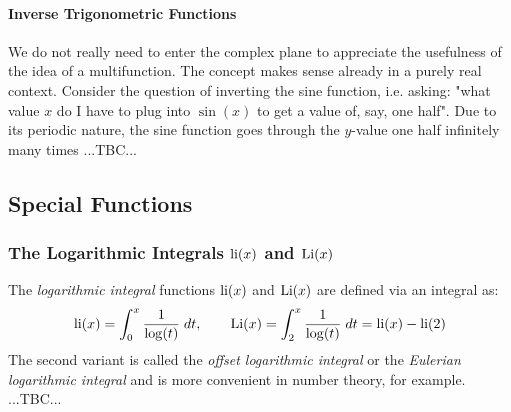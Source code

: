 \paragraph{Inverse Trigonometric Functions} 
We do not really need to enter the complex plane to appreciate the usefulness of the idea of a multifunction. The concept makes sense already in a purely real context. Consider the question of inverting the sine function, i.e. asking: "what value $x$ do I have to plug into $\sin(x)$ to get a value of, say, one half". Due to its periodic nature, the sine function goes through the $y$-value one half infinitely many times ...TBC...






\subsection{Special Functions}

\subsubsection{The Logarithmic Integrals $\operatorname{li}(x)$ and $\operatorname{Li}(x)$}
The \emph{logarithmic integral} functions $\operatorname{li}(x)$ and $\operatorname{Li}(x)$ are defined via an integral as:
\begin{equation}
\label{Eq:LogarithmicIntegral}
 \operatorname{li}(x) = \int_{0}^{x} \frac{1}{\log(t)} \; dt, \qquad
 \operatorname{Li}(x) = \int_{2}^{x} \frac{1}{\log(t)} \; dt
        = \operatorname{li}(x) - \operatorname{li}(2)
\end{equation}
The second variant is called the \emph{offset logarithmic integral} or the \emph{Eulerian logarithmic integral} and is more convenient in number theory, for example. ...TBC...


